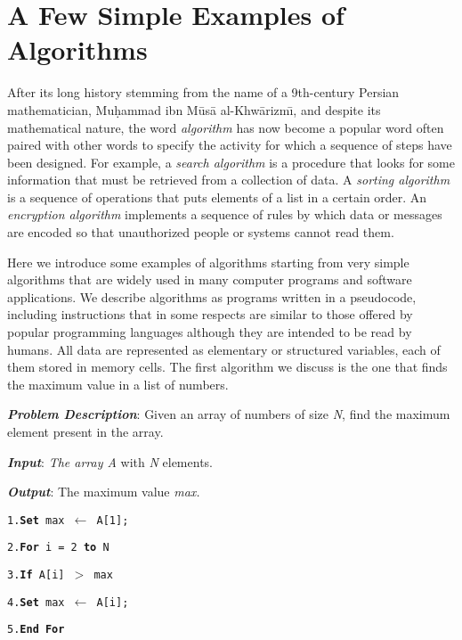 {{{\section{\label{sec:1.6}A Few Simple Examples of Algorithms}

After its long history stemming from the name of a 9th-century Persian mathematician, Mu\d{h}ammad ibn M\={u}s\={a} al-Khw\={a}rizm\={\i}, and despite its mathematical nature, the word \textit{algorithm} has now become a popular word often paired with other words to specify the activity for which a sequence of steps have been designed. For example, a \textit{search algorithm} is a procedure that looks for some information that must be retrieved from a collection of data. A \textit{sorting algorithm} is a sequence of operations that puts elements of a list in a certain order. An \textit{encryption algorithm} implements a sequence of rules by which data or messages are encoded so that unauthorized people or systems cannot read them.

Here we introduce some examples of algorithms starting from very simple algorithms that are widely used in many computer programs and software applications. We describe algorithms as programs written in a pseudocode, including instructions that in some respects are similar to those offered by popular programming languages although they are intended to be read by humans. All data are represented as elementary or structured variables, each of them stored in memory cells. The first algorithm we discuss is the one that finds the maximum value in a list of numbers.


\begin{algorithm}[!h]
\textbf{\textit{Problem Description}}: Given an array of numbers of size \textit{N}, find the maximum element present in the array.

\textbf{\textit{Input}}: \textit{The array A }with \textit{N }elements.

\textbf{\textit{Output}}: The maximum value \textit{max.}

\hrulefill

\medskip
\texttt{1.\qquad     \textbf{Set}  max \textbf{$\leftarrow$}  A[1];}

\texttt{2.\qquad     \textbf{For  }i = 2   \textbf{to}   N}

\texttt{3.\qquad\quad            \textbf{If }A[i] $>$ max}

\texttt{4.\qquad\qquad                \textbf{Set }max $\leftarrow$ A[i];}

\texttt{5.\qquad     \textbf{End For}}


\end{algorithm}}}}
